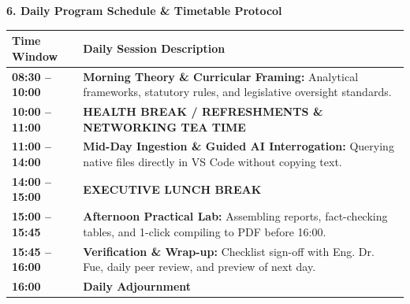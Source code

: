 \documentclass[10pt, a4paper]{article}
\begin{document}
\vspace{0.25cm}
\noindent\textbf{\textcolor{tanzaniablue}{\large 6. Daily Program Schedule \& Timetable Protocol}}
\vspace{0.1cm}
\begin{table}[htbp]
\centering
\small
\begin{tabular}{@{}>{\bfseries}p{2.8cm}p{13.6cm}@{}}
\toprule
Time Window & Daily Session Description \\
\midrule
08:30 -- 10:00 & \textbf{Morning Theory \& Curricular Framing:} Analytical frameworks, statutory rules, and legislative oversight standards. \\
\textbf{10:00 -- 11:00} & \textbf{HEALTH BREAK / REFRESHMENTS \& NETWORKING TEA TIME} \\
11:00 -- 14:00 & \textbf{Mid-Day Ingestion \& Guided AI Interrogation:} Querying native files directly in VS Code without copying text. \\
\textbf{14:00 -- 15:00} & \textbf{EXECUTIVE LUNCH BREAK} \\
15:00 -- 15:45 & \textbf{Afternoon Practical Lab:} Assembling reports, fact-checking tables, and 1-click compiling to PDF before 16:00. \\
15:45 -- 16:00 & \textbf{Verification \& Wrap-up:} Checklist sign-off with Eng. Dr. Fue, daily peer review, and preview of next day. \\
\textbf{16:00} & \textbf{Daily Adjournment} \\
\bottomrule
\end{tabular}
\end{table}
\end{document}
